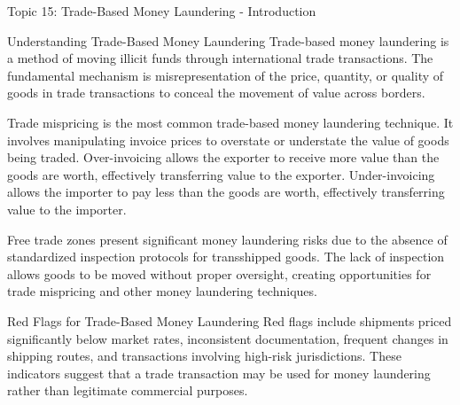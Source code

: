 \documentclass[8pt]{beamer}  %
\begin{document}
	\begin{frame}{Topic 15: Trade-Based Money Laundering - Introduction}
		\begin{block}{\large Understanding Trade-Based Money Laundering}
			Trade-based money laundering is a method of moving illicit funds through international trade transactions. The fundamental mechanism is misrepresentation of the price, quantity, or quality of goods in trade transactions to conceal the movement of value across borders.
			
			Trade mispricing is the most common trade-based money laundering technique. It involves manipulating invoice prices to overstate or understate the value of goods being traded. Over-invoicing allows the exporter to receive more value than the goods are worth, effectively transferring value to the exporter. Under-invoicing allows the importer to pay less than the goods are worth, effectively transferring value to the importer.
			
			Free trade zones present significant money laundering risks due to the absence of standardized inspection protocols for transshipped goods. The lack of inspection allows goods to be moved without proper oversight, creating opportunities for trade mispricing and other money laundering techniques.
		\end{block}
		
		\vspace{0.2cm}
		\begin{block}{\large Red Flags for Trade-Based Money Laundering}
			Red flags include shipments priced significantly below market rates, inconsistent documentation, frequent changes in shipping routes, and transactions involving high-risk jurisdictions. These indicators suggest that a trade transaction may be used for money laundering rather than legitimate commercial purposes.
		\end{block}
	\end{frame}
	
\end{document}
